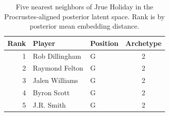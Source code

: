 \begin{table}[htbp]
  \centering\small
  \begin{tabular}{rllc}
    \toprule
    Rank & Player & Position & Archetype \\
    \midrule
    1 & Rob Dillingham & G & 2 \\
    2 & Raymond Felton & G & 2 \\
    3 & Jalen Williams & G & 2 \\
    4 & Byron Scott & G & 2 \\
    5 & J.R. Smith & G & 2 \\
    \bottomrule
  \end{tabular}
  \caption{Five nearest neighbors of Jrue Holiday in the Procrustes-aligned posterior latent space. Rank is by posterior mean embedding distance.}
  \label{tab:Jrue_Holiday_neighbors}
\end{table}

